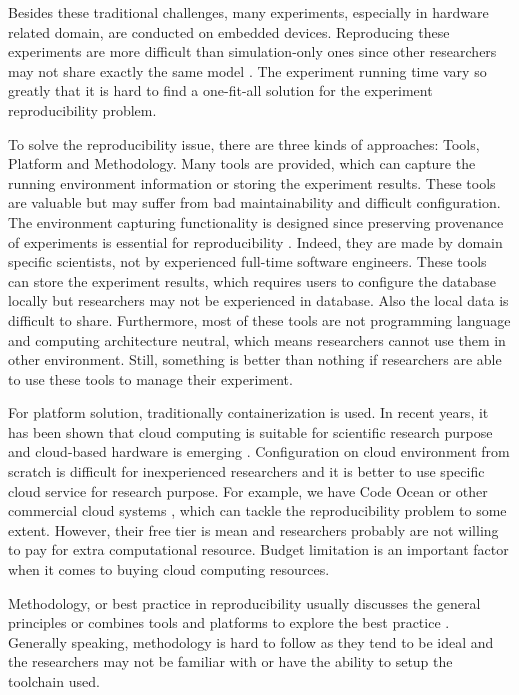 \documentclass[10pt, conference, compsocconf]{IEEEtran}
\begin{document}
Besides these traditional challenges, many experiments, especially in hardware related domain, are conducted on
embedded devices. Reproducing these experiments are more difficult than simulation-only ones since other researchers may not share exactly the same model \cite{report2017}. The experiment running time vary so greatly that it is hard to find a
one-fit-all solution for the experiment reproducibility problem.

To solve the reproducibility issue, there are three kinds of approaches: Tools, Platform and Methodology. Many tools \cite{greff2017sacred} are provided, which can capture the running environment information or storing the experiment results. These tools are valuable but may suffer from bad maintainability and difficult configuration. The environment
capturing functionality is designed since preserving provenance of experiments is essential for reproducibility \cite{freire2018provenance}.
Indeed, they are made by domain specific scientists, not by experienced full-time software engineers. These tools can store the experiment results, which requires users to configure the database locally but researchers may not be experienced in database. Also the local data is difficult to share. Furthermore, most of these tools are not programming language and computing architecture neutral, which means researchers cannot use them in other environment. Still, something is better than nothing if researchers are able to use these tools to manage their experiment.

For platform solution, traditionally containerization is used. In recent years, it has been shown that cloud computing is suitable for scientific research purpose \cite{Howe12} and cloud-based hardware is emerging \cite{cloudhard}. Configuration on cloud environment from scratch is difficult for inexperienced researchers and it is better to use specific cloud service for research purpose. For example, we have Code Ocean or other commercial cloud systems \cite{perkel2018data}, which can tackle the reproducibility problem to some extent. However, their free tier is mean and researchers probably are not willing to pay for extra computational resource. Budget limitation is an important factor when it comes to buying cloud computing resources.

Methodology, or best practice in reproducibility usually discusses the general principles \cite{stodden2014best} or combines tools and platforms to explore the best practice \cite{QashaCW16}. Generally speaking, methodology is hard to follow as they tend to be ideal and the researchers may not be familiar with or have the ability to setup the toolchain used.  
\end{document}
